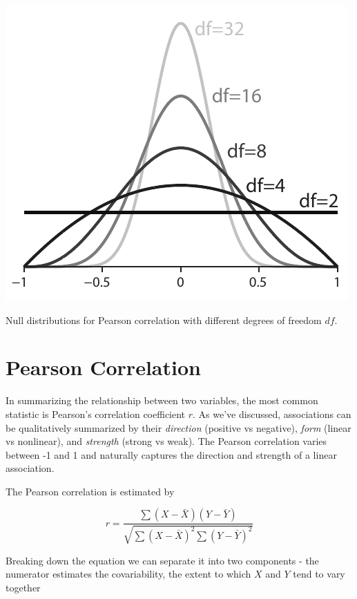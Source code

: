 \documentclass{tufte-handout}
\begin{document}
\begin{marginfigure}[20pt]
  \includegraphics[width=\linewidth]{images/handout8_rpdf}%
  \label{fig:fullfig}%
\caption{Null distributions for Pearson correlation with different degrees of freedom $df$.}
\end{marginfigure}

\section{Pearson Correlation}

In summarizing the relationship between two variables, the most common statistic is Pearson's correlation coefficient $r$. As we've discussed, associations can be qualitatively summarized by their \emph{direction} (positive vs negative), \emph{form} (linear vs nonlinear), and \emph{strength} (strong vs weak). The Pearson correlation varies between -1 and 1 and naturally captures the direction and strength of a linear association.

The Pearson correlation is estimated by

\begin{equation*}
r = \frac{\sum (X-\bar{X})(Y-\bar{Y})}{\sqrt{\sum (X-\bar{X})^2 \sum (Y-\bar{Y})^2}}
\end{equation*}

Breaking down the equation we can separate it into two components - the numerator estimates the covariability, the extent to which $X$ and $Y$ tend to vary together
\end{document}
